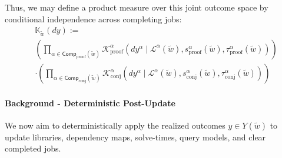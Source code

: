 Thus, we may define a product measure over this joint outcome space by conditional independence across completing jobs:
\begin{align*}
&\mathbb K_{\tilde w}(dy)
:=
\\&\left(\prod_{\alpha\in\mathsf{Comp}_{\mathrm{proof}}(\tilde w)}
\mathcal K^\alpha_{\mathrm{proof}}(dy^\alpha \mid \mathcal L^\alpha(\tilde w), s^\alpha_{\mathrm{proof}}(\tilde w),\tau^\alpha_{\mathrm{proof}}(\tilde w))
\right)
\\&\cdot\left(\prod_{\alpha\in\mathsf{Comp}_{\mathrm{conj}}(\tilde w)}
\mathcal K^\alpha_{\mathrm{conj}}(dy^\alpha \mid \mathcal L^\alpha(\tilde w), s^\alpha_{\mathrm{conj}}(\tilde w),\tau^\alpha_{\mathrm{conj}}(\tilde w))
\right)
\end{align*}

\paragraph{Background - Deterministic Post-Update} 

We now aim to deterministically apply the realized outcomes $y\in Y(\tilde w)$ to update libraries, dependency maps, solve-times, query models, and clear completed jobs.

